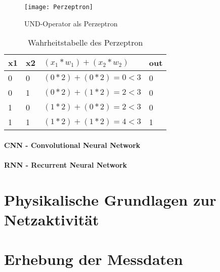     \begin{figure}[H]
        \centering
        \texttt{[image: Perzeptron]}
        \caption{UND-Operator als Perzeptron}
        \label{fig:PerzeptronAND}
    \end{figure}

    \begin{table}[H]
        \centering
        \begin{tabular}{|l|l|l|l|}
            \hline
            x1 & x2 & \( (x_1 * w_1) + (x_2 * w_2) \) & out \\
            \hline
            0 & 0 & \( (0 * 2) + (0 * 2) = 0 < 3 \) & 0 \\
            \hline
            0 & 1 & \( (0 * 2) + (1 * 2) = 2 < 3 \) & 0 \\
            \hline
            1 & 0 & \( (1 * 2) + (0 * 2) = 2 < 3 \) & 0 \\
            \hline
            1 & 1 & \( (1 * 2) + (1 * 2) = 4 < 3 \) & 1 \\
            \hline
        \end{tabular}
        \caption{Wahrheitstabelle des Perzeptron}
        \label{tabl:Perzeptron}
    \end{table}

    \paragraph{CNN - Convolutional Neural Network}
    \paragraph{RNN - Recurrent Neural Network}



\section{Physikalische Grundlagen zur Netzaktivität} \label{physikalischeGrundlagen}

\section{Erhebung der Messdaten} \label{Messdaten}

